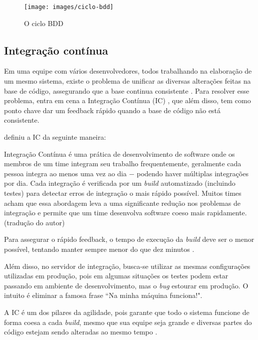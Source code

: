 \begin{figure}[h]
  \center
  \caption{O ciclo BDD}
  \texttt{[image: images/ciclo-bdd]}
  \label{img:ciclo-bdd}
\end{figure}

\subsection{Integração contínua}
\label{sub:integracao_continua}

Em uma equipe com vários desenvolvedores, todos trabalhando na elaboração de um mesmo sistema, existe o problema de unificar as diversas alterações feitas na base de código, assegurando que a base continua consistente \cite{ImproveitCI}. Para resolver esse problema, entra em cena a Integração Contínua (IC) , que além disso, tem como ponto chave dar um feedback rápido quando a base de código não está consistente.

\cite{FowlerCI} definiu a IC da seguinte maneira:

\begin{citacao}
Integração Contínua é uma prática de desenvolvimento de software onde os membros de um time integram seu trabalho frequentemente, geralmente cada pessoa integra ao menos uma vez ao dia $-$ podendo haver múltiplas integrações por dia. Cada integração é verificada por um \textit{build} automatizado (incluindo testes) para detectar erros de integração o mais rápido possível. Muitos times acham que essa abordagem leva a uma significante redução nos problemas de integração e permite que um time desenvolva software coeso mais rapidamente. (tradução do autor)
\end{citacao}

Para assegurar o rápido feedback, o tempo de execução da \textit{build} deve ser o menor possível, tentando manter sempre menor do que dez minutos \cite{FowlerCI}.

Além disso, no servidor de integração, busca-se utilizar as mesmas configurações utilizadas em produção, pois em algumas situações os testes podem estar passando em ambiente de desenvolvimento, mas o \textit{bug} estourar em produção. O intuito é eliminar a famosa frase ``Na minha máquina funciona!".

A IC é um dos pilares da agilidade, pois garante que todo o sistema funcione de forma coesa a cada \textit{build}, mesmo que sua equipe seja grande e diversas partes do código estejam sendo alteradas ao mesmo tempo \cite{CaelumCI}.

